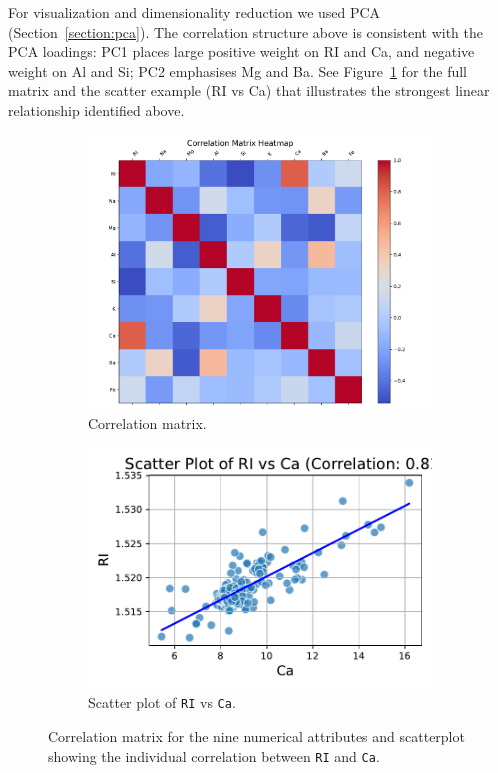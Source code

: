 \documentclass[dtu]{dtuarticle}
\begin{document}
	For visualization and dimensionality reduction we used PCA (Section~\ref{section:pca}). The correlation structure above
	is consistent with the PCA loadings: PC1 places large positive weight on RI and Ca, and negative weight
	on Al and Si; PC2 emphasises Mg and Ba.  See Figure~\ref{fig:correlation} for the full matrix and the
	scatter example (RI vs Ca) that illustrates the strongest linear relationship identified above.

	\begin{figure}
		\centering
		\begin{subfigure}{.49\textwidth}
			\centering
			\includegraphics[width=\textwidth]{figures/correlation_matrix}
			\caption{Correlation matrix.}
			\label{fig:correlation}
		\end{subfigure}
		\begin{subfigure}{.49\textwidth}
			\centering
			\includegraphics[width=\textwidth]{figures/scatter_RI_vs_Ca}
			\caption{Scatter plot of \texttt{RI} vs \texttt{Ca}.}
			\label{fig:individual-correlation}
		\end{subfigure}
		\caption{Correlation matrix for the nine numerical attributes and scatterplot showing the individual correlation between \texttt{RI} and \texttt{Ca}.}
	\end{figure}
\end{document}
